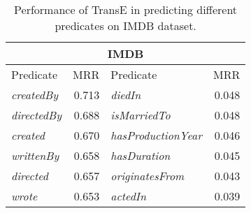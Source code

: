 \begin{table}[thb]
\centering
\begin{tabular}{|l|r|l|r|} 
 \hline
 \multicolumn{4}{|c|}{IMDB} \\
 \hline
 Predicate & MRR & Predicate & MRR  \\
 \hline
\textit{createdBy} & 0.713 & \textit{diedIn} & 0.048 \\
\textit{directedBy} & 0.688 & \textit{isMarriedTo} & 0.048 \\
\textit{created} & 0.670 & \textit{hasProductionYear} & 0.046 \\
\textit{writtenBy} & 0.658 & \textit{hasDuration} & 0.045 \\
\textit{directed} & 0.657 & \textit{originatesFrom} & 0.043 \\
\textit{wrote} & 0.653 & \textit{actedIn} & 0.039 \\
 \hline
\end{tabular}
\newline
\caption{Performance of TransE in predicting different predicates on IMDB dataset.}
\label{table:imdb_predicate_mrr}
\end{table}